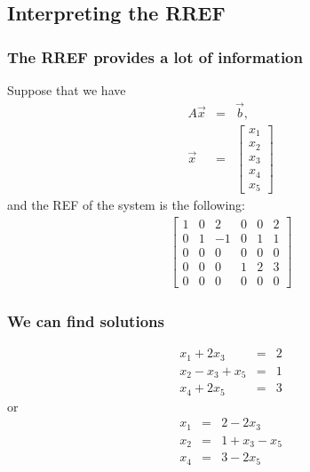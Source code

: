 \subsection{Interpreting the RREF}

\begin{frame}
  \frametitle{The RREF provides a lot of information}

  Suppose that we have 
  \begin{eqnarray*}
    A\vec{x} & = & \vec{b}, \\
    \vec{x} & = & 
    \left[ \begin{array}{r}x_1\\x_2\\x_3\\x_4\\x_5\end{array}\right]
  \end{eqnarray*}
  and the REF of the system is the following:
  \begin{eqnarray*}
    \left[
      \begin{array}{rrrrr|r}
        1 & 0 & 2 & 0 & 0 & 2 \\
        0 & 1 & -1 & 0 & 1 & 1 \\
        0 & 0 & 0 & 0 & 0 & 0 \\
        0 & 0 & 0 & 1 & 2 & 3 \\
        0 & 0 & 0 & 0 & 0 & 0 
      \end{array}
    \right]
  \end{eqnarray*}

\end{frame}


\begin{frame}
  \frametitle{We can find solutions}
  

  \begin{eqnarray*}
    x_1 + 2x_3 & = & 2 \\
    x_2 - x_3 + x_5 & = & 1 \\
    x_4 + 2x_5 & = & 3 
  \end{eqnarray*}
  or
  \begin{eqnarray*}
    x_1  & = & 2 -  2x_3\\
    x_2  & = & 1 +  x_3 - x_5\\
    x_4  & = & 3 - 2x_5
  \end{eqnarray*}

\end{frame}

